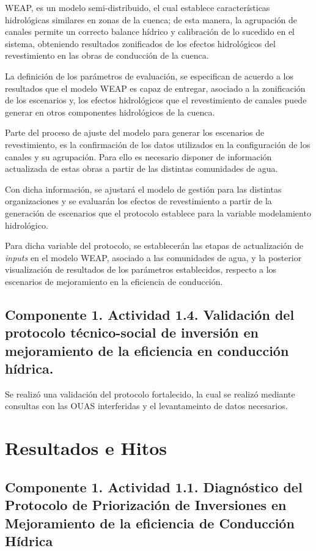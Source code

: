 \documentclass[]{article}
\begin{document}
WEAP, es un modelo semi-distribuido, el cual establece características hidrológicas similares en zonas de la cuenca; de esta manera, la agrupación de canales permite un correcto balance hídrico y calibración de lo sucedido en el sistema, obteniendo resultados zonificados de los efectos hidrológicos del revestimiento en las obras de conducción de la cuenca.

La definición de los parámetros de evaluación, se especifican de acuerdo a los resultados que el modelo WEAP es capaz de entregar, asociado a la zonificación de los escenarios y, los efectos hidrológicos que el revestimiento de canales puede generar en otros componentes hidrológicos de la cuenca.

Parte del proceso de ajuste del modelo para generar los escenarios de revestimiento, es la confirmación de los datos utilizados en la configuración de los canales y su agrupación. Para ello es necesario disponer de información actualizada de estas obras a partir de las distintas comunidades de agua.

Con dicha información, se ajustará el modelo de gestión para las distintas organizaciones y se evaluarán los efectos de revestimiento a partir de la generación de escenarios que el protocolo establece para la variable modelamiento hidrológico.

Para dicha variable del protocolo, se establecerán las etapas de actualización de \textit{inputs} en el modelo WEAP, asociado a las comunidades de agua, y la posterior visualización de resultados de los parámetros establecidos, respecto a los escenarios de mejoramiento en la eficiencia de conducción.


\subsection{Componente 1. Actividad 1.4. Validación del protocolo técnico-social de inversión en mejoramiento de la eficiencia en conducción hídrica.}

Se realizó una validación del protocolo fortalecido, la cual se realizó mediante consultas con las OUAS interferidas y el levantameinto de datos necesarios.


\clearpage
\section{Resultados e Hitos}

\subsection{Componente 1. Actividad 1.1. Diagnóstico del Protocolo de Priorización de Inversiones en Mejoramiento de la eficiencia de Conducción Hídrica}
\end{document}
